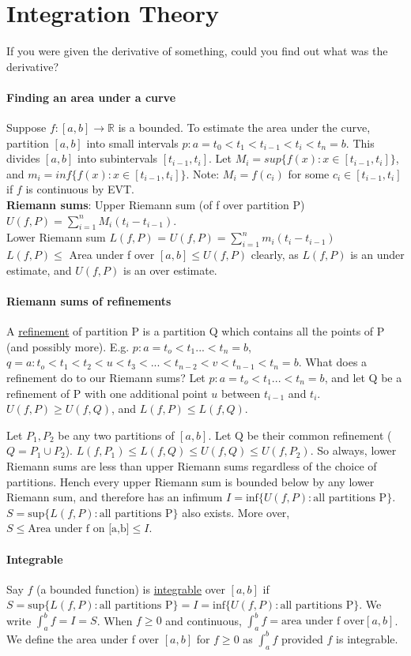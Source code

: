 \documentclass[10pt,letter]{article}
\begin{document}
\section*{Integration Theory}
If you were given the derivative of something, could you find out what was the derivative? 

\paragraph*{Finding an area under a curve}
Suppose $f:[a,b]\rightarrow\mathbb{R}$ is a bounded. To estimate the area under the curve, partition $[a,b]$ into small intervals $p:a=t_0<t_1<t_{i-1}<t_i<t_n=b$. This divides $[a,b]$ into subintervals $[t_{i-1},t_i]$. Let $M_i=sup\{f(x):x\in[t_{i-1},t_i]\}$, and $m_i=inf\{f(x):x\in[t_{i-1},t_i]\}$. Note: $M_i=f(c_i)$ for some $c_i\in[t_{i-1},t_i]$ if $f$ is continuous by EVT. \\ 
\textbf{Riemann sums}: Upper Riemann sum (of f over partition P)$U(f,P)=\sum_{i=1}^nM_i(t_i-t_{i-1})$. \\ 
Lower Riemann sum $L(f,P)$ = $U(f,P)=\sum_{i=1}^nm_i(t_i-t_{i-1})$ \\ 
$L(f,P)\leq$ Area under f over $[a,b]\leq U(f,P)$ clearly, as $L(f,P)$ is an under estimate, and $U(f,P)$ is an over estimate.

\paragraph*{Riemann sums of refinements}
A \underline{refinement} of partition P is a partition Q which contains all the points of P (and possibly more). E.g. $p:a=t_o<t_1...<t_n=b$, $q=a:t_o<t_1<t_2<u<t_3<...<t_{n-2}<v<t_{n-1}<t_n=b$. What does a refinement do to our Riemann sums? Let $p:a=t_o<t_1...<t_n=b$, and let Q be a refinement of P with one additional point $u$ between $t_{i-1}$ and $t_i$. $U(f,P)\geq U(f,Q)$, and $L(f,P)\leq L(f,Q)$. 

Let $P_1,P_2$ be any two partitions of $[a,b]$. Let Q be their common refinement ($Q=P_1\cup P_2$). $L(f,P_1)\leq L(f,Q)\leq U(f,Q)\leq U(f,P_2)$. So always, lower Riemann sums are less than upper Riemann sums regardless of the choice of partitions. Hench every upper Riemann sum is bounded below by any lower Riemann sum, and therefore has an infimum $I = \text{inf}\{U(f,P):\text{all partitions P}\}$. $S=\text{sup}\{L(f,P):\text{all partitions P}\}$ also exists. More over, $S\leq \text{Area under f on [a,b]}\leq I$. 

\paragraph{Integrable}
Say $f$ (a bounded function) is \underline{integrable} over $[a,b]$ if $S=\text{sup}\{L(f,P):\text{all partitions P}\} = I=\text{inf}\{U(f,P):\text{all partitions P}\}$. We write $\int_a^bf=I=S$. When $f\geq0$ and continuous, $\int_a^bf=\text{area under f over}[a,b]$. We define the area under f over $[a,b]$ for $f\geq0$ as $\int_a^bf$ provided $f$ is integrable. 
\end{document}
